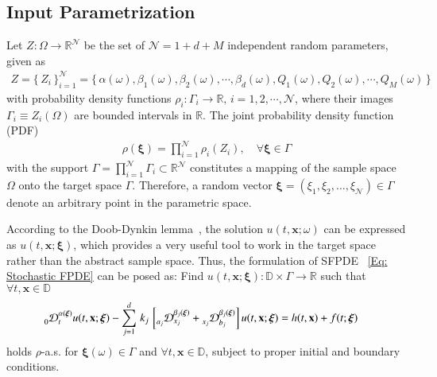 \subsection{Input Parametrization}
\label{Sec: Input Parametrization}
%
%
Let $Z: \Omega \rightarrow \mathbb{R}^{\mathcal{N}}$ be the set of $\mathcal{N} = 1+d+M$ independent random parameters, given as
%
\begin{align*}
%
Z = \Big\lbrace \,  Z_i \, \Big\rbrace_{i=1}^{\mathcal{N}} 
= \Big\lbrace \, 
\alpha(\omega) , \beta_1(\omega) , \beta_2(\omega) , \cdots , \beta_d(\omega) , Q_1(\omega) , Q_2(\omega) , \cdots , Q_M(\omega) 
\, \Big\rbrace
%
\end{align*}
%
with probability density functions $\rho_i : \Gamma_i \rightarrow \mathbb{R}, \, i=1,2,\cdots,\mathcal{N}$, where their images $\Gamma_i \equiv Z_i(\Omega)$ are bounded intervals in $\mathbb{R}$. The joint probability density function (PDF) 
%
\begin{align}
%
\rho(\boldsymbol \xi) = \prod_{i=1}^{\mathcal{N}} \rho_i(Z_i), \quad \forall \boldsymbol{\xi} \in \Gamma
%
\end{align}
%
with the support $\Gamma = \prod_{i=1}^{\mathcal{N}} \Gamma_{i} \subset \mathbb{R}^{\mathcal{N}}$ constitutes a mapping of the sample space $\Omega$ onto the target space $\Gamma$. Therefore, a random vector $\boldsymbol \xi = (\xi_1, \xi_2,\ldots,\xi_{\mathcal{N}}) \in \Gamma $ denote an arbitrary point in the parametric space. 

According to the Doob-Dynkin lemma~\cite{Oksendal98}, the solution $u(t,\textbf{x};\omega)$ can be expressed as $u(t,\textbf{x};\boldsymbol \xi)$, which provides a very useful tool to work in the target space rather than the abstract sample space. Thus, the formulation of SFPDE ~\eqref{Eq: Stochastic FPDE} can be posed as: Find $u(t,\textbf{x};\boldsymbol\xi): \mathbb{D}\times \Gamma \rightarrow \mathbb{R}$ such that $\forall  t,\textbf{x} \in \mathbb{D}$    
%
\begin{align}
\label{Doob_momentum-2}
%
\prescript{}{0}{\mathcal{D}}_{t}^{\alpha(\boldsymbol{\xi})} u(t,\textbf{x};\boldsymbol{\xi}) 
& - \sum_{j=1}^{d} \, k_{j} \,
\left[ \prescript{}{a_j}{\mathcal{D}}_{x_j}^{\beta_j(\boldsymbol{\xi})}
+ \prescript{}{x_j}{\mathcal{D}}_{b_j}^{\beta_j(\boldsymbol{\xi})} 
\right]
u(t,\textbf{x};\boldsymbol{\xi}) 
= h(t,\textbf{x}) +  f(t;\boldsymbol{\xi}) 
%
\end{align}
%
holds $\rho$-a.s. for $\boldsymbol\xi(\omega) \in \Gamma$ and $\forall  t,\textbf{x}\in \mathbb{D}$, subject to proper initial and boundary conditions. 




